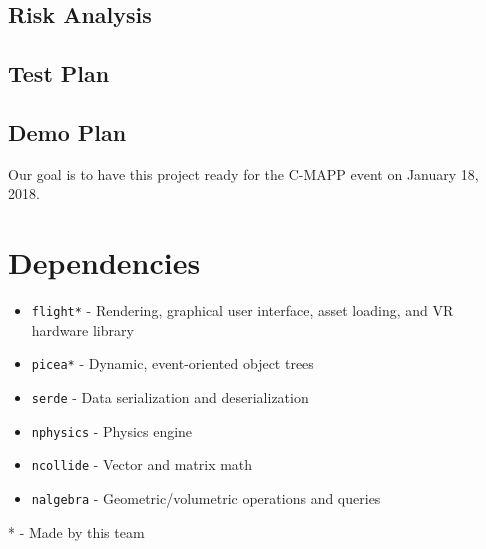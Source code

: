 \documentclass[titlepage,12pt]{article}
\begin{document}
\subsection{Risk Analysis}

\subsection{Test Plan}

\subsection{Demo Plan}
Our goal is to have this project ready for the C-MAPP event on January 18, 2018.

\section{Dependencies}

\begin{itemize}
    \item \texttt{flight*} - Rendering, graphical user interface, asset loading,
    and VR hardware library
    \item \texttt{picea*} - Dynamic, event-oriented object trees
    \item \texttt{serde} - Data serialization and deserialization
    \item \texttt{nphysics} - Physics engine
    \item \texttt{ncollide} - Vector and matrix math
    \item \texttt{nalgebra} - Geometric/volumetric operations and queries
\end{itemize}

* - Made by this team
\end{document}
